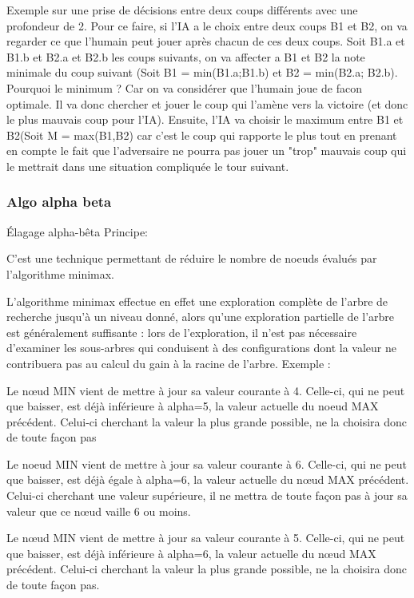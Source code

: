 \documentclass[a4]{article}
\begin{document}
Exemple sur une prise de décisions entre deux coups différents avec une profondeur de 2.
Pour ce faire, si l'IA a le choix entre deux coups B1 et B2, on va regarder ce que l'humain peut jouer
après chacun de ces deux coups. Soit B1.a et B1.b et B2.a et B2.b les coups suivants, on va affecter a B1
 et B2 la note minimale
du coup suivant (Soit B1 = min(B1.a;B1.b) et B2 = min(B2.a; B2.b). Pourquoi le minimum ? Car on va considérer que 
l'humain joue de facon optimale. Il va donc chercher et jouer le coup qui l'amène vers la victoire (et donc le plus mauvais 
coup pour l'IA).
Ensuite, l'IA va choisir le maximum entre B1 et B2(Soit M = max(B1,B2) car c'est le coup qui rapporte le plus tout en prenant
en compte le
fait que l'adversaire ne pourra pas jouer un "trop" mauvais coup qui le mettrait dans une situation compliquée le tour
suivant.
											\subsubsection{Algo alpha beta}
Élagage alpha-bêta
Principe:

C'est une technique permettant de réduire le nombre de noeuds évalués par l'algorithme minimax.

L'algorithme minimax effectue en effet une exploration complète de l'arbre de recherche jusqu'à un niveau donné,
alors qu'une exploration partielle de l'arbre est généralement suffisante : lors de l'exploration, il n'est pas nécessaire
d'examiner les sous-arbres qui conduisent à des configurations dont la valeur ne contribuera pas au calcul du gain
à la racine de l'arbre.
Exemple :
										
										
Le nœud MIN vient de mettre à jour sa valeur courante à 4. Celle-ci, 
qui ne peut que baisser, est déjà inférieure à alpha=5, la valeur actuelle du noeud MAX précédent.
 Celui-ci cherchant la valeur la plus grande possible, ne la choisira donc de toute façon pas
 
 Le noeud MIN vient de mettre à jour sa valeur courante à 6. Celle-ci, qui ne peut que baisser, est déjà égale à alpha=6, la valeur
  actuelle du nœud MAX précédent. Celui-ci cherchant une valeur supérieure, il ne mettra de toute façon pas à jour sa valeur
   que ce nœud vaille 6 ou moins.
	
	
Le nœud MIN vient de mettre à jour sa valeur courante à 5. Celle-ci, qui ne peut que baisser, 
est déjà inférieure à alpha=6, la valeur actuelle du nœud MAX précédent. Celui-ci cherchant la valeur la plus grande possible,
 ne la choisira donc de toute façon pas.	
										
\end{document}
